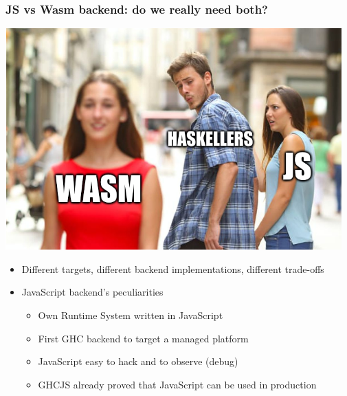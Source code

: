 \documentclass[aspectratio=169]{beamer}
\begin{document}
\begin{frame}
\frametitle{ JS vs Wasm backend: do we really need both?}
\begin{center}
\includegraphics[scale=0.2]{images/js_vs_wasm.png}
\end{center}
\begin{itemize}
\item Different targets, different backend implementations, different trade-offs
\item JavaScript backend’s peculiarities
\begin{itemize}
\item Own Runtime System written in JavaScript
\item First GHC backend to target a managed platform
\item JavaScript easy to hack and to observe (debug)
\item GHCJS already proved that JavaScript can be used in production
\end{itemize}
\end{itemize}
\end{frame}
\end{document}
